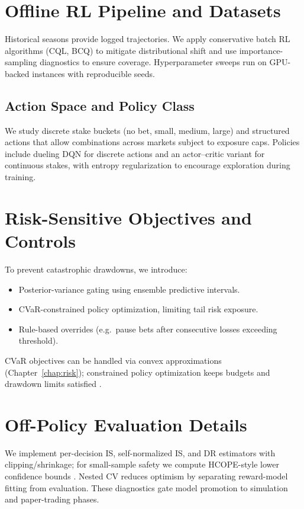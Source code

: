 \section{Offline RL Pipeline and Datasets}
Historical seasons provide logged trajectories. We apply conservative batch RL algorithms (CQL, BCQ) to mitigate distributional shift and use importance-sampling diagnostics to ensure coverage. Hyperparameter sweeps run on GPU-backed instances with reproducible seeds.

\subsection{Action Space and Policy Class}
We study discrete stake buckets (no bet, small, medium, large) and structured actions that allow combinations across markets subject to exposure caps. Policies include dueling DQN for discrete actions and an actor--critic variant for continuous stakes, with entropy regularization to encourage exploration during training.

\section{Risk-Sensitive Objectives and Controls}
To prevent catastrophic drawdowns, we introduce:
\begin{itemize}
  \item Posterior-variance gating using ensemble predictive intervals.
  \item CVaR-constrained policy optimization, limiting tail risk exposure.
  \item Rule-based overrides (e.g.\ pause bets after consecutive losses exceeding threshold).
\end{itemize}
CVaR objectives can be handled via convex approximations (Chapter~\ref{chap:risk}); constrained policy optimization keeps budgets and drawdown limits satisfied \citep{achiam2017cpo,tamar2015cvar}.

\section{Off-Policy Evaluation Details}
We implement per-decision IS, self-normalized IS, and DR estimators with clipping/shrinkage; for small-sample safety we compute HCOPE-style lower confidence bounds \citep{thomas2015}. Nested CV reduces optimism by separating reward-model fitting from evaluation. These diagnostics gate model promotion to simulation and paper-trading phases.


